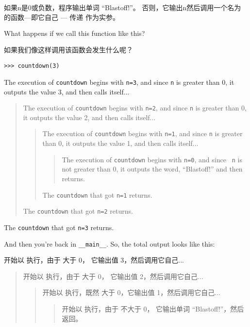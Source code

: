 {{{{如果n是0或负数，程序输出单词 ``Blastoff!''。
否则，它输出n然后调用一个名为  的函数—即它自己 --- 传递  作为实参。

What happens if we call this function like this?

如果我们像这样调用该函数会发生什么呢？


\begin{lstlisting}
>>> countdown(3)
\end{lstlisting}

%
The execution of {\tt countdown} begins with {\tt n=3}, and since
{\tt n} is greater than 0, it outputs the value 3, and then calls itself...

\begin{quote}
The execution of {\tt countdown} begins with {\tt n=2}, and since
{\tt n} is greater than 0, it outputs the value 2, and then calls itself...

\begin{quote}
The execution of {\tt countdown} begins with {\tt n=1}, and since
{\tt n} is greater than 0, it outputs the value 1, and then calls itself...

\begin{quote}
The execution of {\tt countdown} begins with {\tt n=0}, and since {\tt
n} is not greater than 0, it outputs the word, ``Blastoff!'' and then
returns.
\end{quote}

The {\tt countdown} that got {\tt n=1} returns.
\end{quote}

The {\tt countdown} that got {\tt n=2} returns.
\end{quote}

The {\tt countdown} that got {\tt n=3} returns.

And then you're back in \verb"__main__".  So, the
total output looks like this:


 开始以  执行，由于  大于 0， 它输出值 3，然后调用它自己...

\begin{quote}
 开始以  执行，由于  大于 0， 它输出值 2，然后调用它自己...

\begin{quote}
 开始以  执行，既然  大于 0，它输出值 1，然后调用它自己...

\begin{quote}
 开始以  执行，由于  不大于 0， 它输出单词 ``Blastoff!''，然后返回。
\end{quote}


\end{quote}
\end{quote}}}}}
